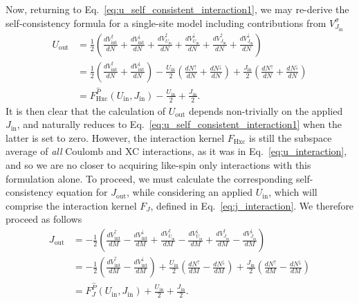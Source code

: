 Now, returning to Eq.~\eqref{eq:u_self_consistent_interaction1}, 
we may re-derive the self-consistency formula 
for a single-site model including contributions from $V^\sigma_{J_\textrm{in}}$ 
%
\begin{align}
U_\textrm{out}&
=\frac{1}{2}\left(\frac{dV_\textrm{int}^\uparrow}{dN}+\frac{dV_\textrm{int}^\downarrow}{dN}
+\frac{dV_{U_\textrm{in}}^\uparrow}{dN}+\frac{dV_{U_\textrm{in}}^\downarrow}{dN}
+\frac{dV_{J_\textrm{in}}^\uparrow}{dN}+\frac{dV_{J_\textrm{in}}^\downarrow}{dN}\right)
\nonumber \\[0.75em]
&=\frac{1}{2}\left(\frac{dV_\textrm{int}^\uparrow}{dN}+\frac{dV_\textrm{int}^\downarrow}{dN}\right)
-\frac{U_\textrm{in}}{2}\left(\frac{dN^\uparrow}{dN}+\frac{dN^\downarrow}{dN}\right)
+\frac{J_\textrm{in}}{2}\left(\frac{dN^\uparrow}{dN}+\frac{dN^\downarrow}{dN}\right)
\nonumber \\[0.75em]
&=F_\textrm{Hxc}^{\hat{P}}(U_\textrm{in},J_\textrm{in})-\frac{U_\textrm{in}}{2}+\frac{J_\textrm{in}}{2}. 
\label{eq:u_self_consistent_interaction2}
\end{align}
%
It is then clear that the calculation of $U_\textrm{out}$ 
depends non-trivially on the applied $J_\textrm{in}$, 
and naturally reduces to 
Eq.~\eqref{eq:u_self_consistent_interaction1} 
when the latter is set to zero.
%
However, 
the interaction kernel $F_\textrm{Hxc}$ 
is still the subspace average of {\it all} 
Coulomb and XC interactions, 
as it was in Eq.~\eqref{eq:u_interaction}, 
and so we are no closer to acquiring 
like-spin only interactions with this formulation alone.
%
To proceed, 
we must calculate the corresponding 
self-consistency equation for $J_\textrm{out}$, 
while considering an applied $U_\textrm{in}$, 
which will comprise the interaction kernel $F_J$, 
defined in Eq.~\eqref{eq:j_interaction}.
%
We therefore proceed as follows
%
\begin{align}
J_\textrm{out}&
=-\frac{1}{2}\left(\frac{dV_\textrm{int}^\uparrow}{dM}-\frac{dV_\textrm{int}^\downarrow}{dM}
+\frac{dV_{U_\textrm{in}}^\uparrow}{dM}-\frac{dV_{U_\textrm{in}}^\downarrow}{dM}
+\frac{dV_{J_\textrm{in}}^\uparrow}{dM}-\frac{dV_{J_\textrm{in}}^\downarrow}{dM}\right)
\nonumber \\[0.75em]
&=-\frac{1}{2}\left(\frac{dV_\textrm{int}^\uparrow}{dM}-\frac{dV_\textrm{int}^\downarrow}{dM}\right)
+\frac{U_\textrm{in}}{2}\left(\frac{dN^\uparrow}{dM}-\frac{dN^\downarrow}{dM}\right)
+\frac{J_\textrm{in}}{2}\left(\frac{dN^\uparrow}{dM}-\frac{dN^\downarrow}{dM}\right)
\nonumber \\[0.75em]
&=F_J^{\hat{P}}(U_\textrm{in},J_\textrm{in})+\frac{U_\textrm{in}}{2}+\frac{J_\textrm{in}}{2}. 
\label{eq:j_self_consistent_interaction2}
\end{align}
%

